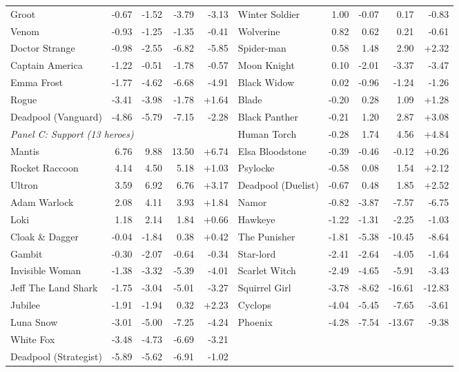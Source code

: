 \documentclass[11pt]{article}
\begin{document}
\begin{landscape}
\begin{center}
{\begin{tabular}{l r r r r @{\hspace{2.2em}} l r r r r}
Groot & -0.67 & -1.52 & -3.79 & -3.13 & Winter Soldier & 1.00 & -0.07 & 0.17 & -0.83 \\
Venom & -0.93 & -1.25 & -1.35 & -0.41 & Wolverine & 0.82 & 0.62 & 0.21 & -0.61 \\
Doctor Strange & -0.98 & -2.55 & -6.82 & -5.85 & Spider-man & 0.58 & 1.48 & 2.90 & +2.32 \\
Captain America & -1.22 & -0.51 & -1.78 & -0.57 & Moon Knight & 0.10 & -2.01 & -3.37 & -3.47 \\
Emma Frost & -1.77 & -4.62 & -6.68 & -4.91 & Black Widow & 0.02 & -0.96 & -1.24 & -1.26 \\
Rogue & -3.41 & -3.98 & -1.78 & +1.64 & Blade & -0.20 & 0.28 & 1.09 & +1.28 \\
Deadpool (Vanguard) & -4.86 & -5.79 & -7.15 & -2.28 & Black Panther & -0.21 & 1.20 & 2.87 & +3.08 \\
\multicolumn{5}{l}{\emph{Panel C: Support (13 heroes)}} & Human Torch & -0.28 & 1.74 & 4.56 & +4.84 \\
Mantis & 6.76 & 9.88 & 13.50 & +6.74 & Elsa Bloodstone & -0.39 & -0.46 & -0.12 & +0.26 \\
Rocket Raccoon & 4.14 & 4.50 & 5.18 & +1.03 & Psylocke & -0.58 & 0.08 & 1.54 & +2.12 \\
Ultron & 3.59 & 6.92 & 6.76 & +3.17 & Deadpool (Duelist) & -0.67 & 0.48 & 1.85 & +2.52 \\
Adam Warlock & 2.08 & 4.11 & 3.93 & +1.84 & Namor & -0.82 & -3.87 & -7.57 & -6.75 \\
Loki & 1.18 & 2.14 & 1.84 & +0.66 & Hawkeye & -1.22 & -1.31 & -2.25 & -1.03 \\
Cloak \& Dagger & -0.04 & -1.84 & 0.38 & +0.42 & The Punisher & -1.81 & -5.38 & -10.45 & -8.64 \\
Gambit & -0.30 & -2.07 & -0.64 & -0.34 & Star-lord & -2.41 & -2.64 & -4.05 & -1.64 \\
Invisible Woman & -1.38 & -3.32 & -5.39 & -4.01 & Scarlet Witch & -2.49 & -4.65 & -5.91 & -3.43 \\
Jeff The Land Shark & -1.75 & -3.04 & -5.01 & -3.27 & Squirrel Girl & -3.78 & -8.62 & -16.61 & -12.83 \\
Jubilee & -1.91 & -1.94 & 0.32 & +2.23 & Cyclops & -4.04 & -5.45 & -7.65 & -3.61 \\
Luna Snow & -3.01 & -5.00 & -7.25 & -4.24 & Phoenix & -4.28 & -7.54 & -13.67 & -9.38 \\
White Fox & -3.48 & -4.73 & -6.69 & -3.21 &  &  &  &  &  \\
Deadpool (Strategist) & -5.89 & -5.62 & -6.91 & -1.02 &  &  &  &  &  \\

\end{tabular}}
\end{center}
\end{landscape}
\end{document}
